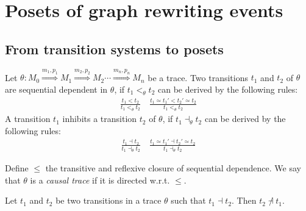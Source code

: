 \section{Posets of graph rewriting events}

\subsection{From transition systems to posets}

\begin{definition}
  \label{def:causal_trace}
  Let $\theta:M_0\overset{m_1,p_1}{\Rightarrow} M_1\overset{m_2,p_2}{\Rightarrow} M_2 \cdots \overset{m_n,p_n}{\Rightarrow} M_n$ be a trace.
  Two transitions $t_1$ and $t_2$ of $\theta$ are sequential dependent in $\theta$, if $t_1<_{\theta} t_2$ can be derived by the following rules:
  \begin{align*}
    \frac{t_1 < t_2}{t_1 <_{\theta} t_2}\quad
    \frac{t_1\simeq t_1'<t_2'\simeq t_2}{t_1 <_{\theta} t_2}
  \end{align*}
  A transition $t_1$ inhibits a transition $t_2$ of $\theta$, if $t_1\dashv_{\theta} t_2$ can be derived by the following rules:
  \begin{align*}
    \frac{t_1 \dashv t_2}{t_1 \dashv_{\theta} t_2}\quad
    \frac{t_1\simeq t_1'\dashv t_2'\simeq t_2}{t_1 \dashv_{\theta} t_2}
  \end{align*}

  Define $\leq$ the transitive and reflexive closure of sequential dependence. We say that $\theta$ is a \emph{causal trace} if it is directed w.r.t. $\leq$.
\end{definition}

\begin{lemma}
  \label{lem:inhibiting_pair}
  Let $t_1$ and $t_2$ be two transitions in a trace $\theta$ such that $t_1\dashv t_2$. Then $t_2\not\dashv t_1$.
\end{lemma}



